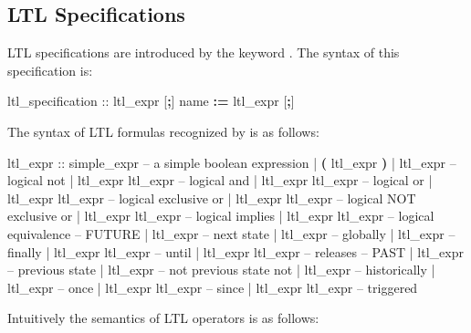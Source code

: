 \subsection{LTL Specifications}
\label{LTL Specifications}
%
LTL specifications are introduced by the keyword
. 
%
The syntax of this specification is:
%
\begin{Grammar}
ltl_specification ::  ltl_expr [\textbf{;}]
                       name \textbf{:=} ltl_expr [\textbf{;}]
\end{Grammar}
%
The syntax of LTL formulas recognized by \nusmv is as follows:
\begin{Grammar}
ltl_expr ::
    simple_expr              -- a simple boolean expression
    | \textbf{(} ltl_expr \textbf{)}
    | \operator{!} ltl_expr             -- logical not
    | ltl_expr \operator{\&} ltl_expr    -- logical and
    | ltl_expr \operator{|} ltl_expr    -- logical or
    | ltl_expr  ltl_expr  -- logical exclusive or
    | ltl_expr  ltl_expr -- logical NOT exclusive or
    | ltl_expr \operator{->} ltl_expr   -- logical implies
    | ltl_expr \operator{<->} ltl_expr  -- logical equivalence
    -- FUTURE
    |  ltl_expr             -- next state
    |  ltl_expr             -- globally
    |  ltl_expr             -- finally
    | ltl_expr  ltl_expr    -- until
    | ltl_expr  ltl_expr    -- releases
    -- PAST
    |  ltl_expr             -- previous state
    |  ltl_expr             -- not previous state not
    |  ltl_expr             -- historically
    |  ltl_expr             -- once 
    | ltl_expr  ltl_expr    -- since
    | ltl_expr  ltl_expr    -- triggered
\end{Grammar}
%
Intuitively the semantics of LTL operators is as follows:
% 
